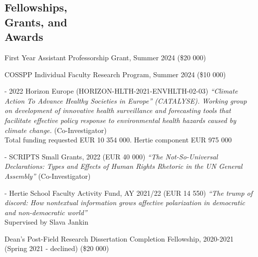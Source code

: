 \documentclass[margin,line,10.95pt]{res}
\begin{document}
\begin{resume}


\section{\sc Fellowships,   \\ Grants,  and  \\Awards}

First Year Assistant Professorship Grant, Summer 2024 (\$20 000)

\vspace*{-3.5mm}

COSSPP Individual Faculty Research Program, Summer 2024 (\$10 000)


- 2022 Horizon Europe (HORIZON-HLTH-2021-ENVHLTH-02-03) \textit{“Climate Action To Advance Healthy Societies in Europe” (CATALYSE). Working group on development of innovative health surveillance and forecasting tools that facilitate effective policy response to environmental health hazards caused by climate change.} (Co-Investigator)
\\
Total funding requested EUR 10 354 000. Hertie component EUR 975 000

\vspace*{-3.5mm}

- SCRIPTS Small Grants, 2022 (EUR 40 000) \textit{“The Not-So-Universal Declarations: Types and Effects of Human Rights Rhetoric in the UN General Assembly”} (Co-Investigator)

\vspace*{-3.5mm}

- Hertie School Faculty Activity Fund, AY 2021/22 (EUR 14 550) \textit{“The trump of discord: How nontextual information grows affective polarization in democratic and non-democratic world”} 
\\
Supervised by Slava Jankin
\\

\vspace*{-4.5mm}

Dean's Post-Field Research Dissertation Completion Fellowship, 2020-2021 (Spring 2021 - declined) (\$20 000)
\vspace*{-4.5mm}


\end{resume}
\end{document}

